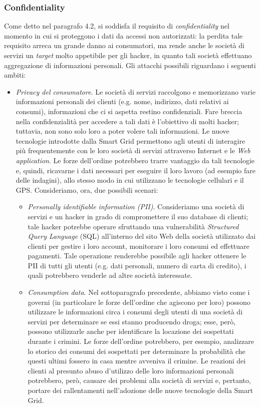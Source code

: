 \subsubsection{Confidentiality}
Come detto nel paragrafo 4.2, si soddisfa il requisito di \textit{confidentiality} nel momento in cui si proteggono i dati da accessi non autorizzati: la perdita tale requisito arreca un grande danno ai consumatori, ma rende anche le società di servizi un \textit{target} molto appetibile per gli hacker, in quanto tali società effettuano aggregazione di informazioni personali. Gli attacchi possibili riguardano i seguenti ambiti:
\begin{itemize}
\item \textit{Privacy del consumatore}. Le società di servizi raccolgono e memorizzano varie informazioni personali dei clienti (e.g. nome, indirizzo, dati relativi ai consumi), informazioni che ci si aspetta restino confidenziali. Fare breccia nella confidenzialità per accedere a tali dati è l'obiettivo di molti hacker; tuttavia, non sono solo loro a poter volere tali informazioni. Le nuove tecnologie introdotte dalla Smart Grid permettono agli utenti di interagire più frequentemente con le loro società di servizi attraverso Internet e le \textit{Web application}. Le forze dell'ordine potrebbero trarre vantaggio da tali tecnologie e, quindi, ricavarne i dati necessari per eseguire il loro lavoro (ad esempio fare delle indagini), allo stesso modo in cui utilizzano le tecnologie cellulari e il GPS. Consideriamo, ora, due possibili scenari:
	\begin{itemize}
	\item \textit{Personally identifiable information (PII)}. Consideriamo una società di servizi e un hacker in grado di compromettere il suo database di clienti; tale hacker potrebbe operare sfruttando una vulnerabilità \textit{Structured Query Language} (SQL) all'interno del sito Web della società utilizzato dai clienti per gestire i loro account, monitorare i loro consumi ed effettuare pagamenti. Tale operazione renderebbe possibile agli hacker ottenere le PII  di tutti gli utenti (e.g. dati personali, numero di carta di credito), i quali potrebbero venderle ad altre società interessate.
	\item \textit{Consumption data}. Nel sottoparagrafo precedente, abbiamo visto come i governi (in particolare le forze dell'ordine che agiscono per loro) possono utilizzare le informazioni circa i consumi degli utenti di una società di servizi per determinare se essi stanno producendo droga; esse, però, possono utilizzarle anche per identificare la locazione dei sospettati durante i crimini. Le forze dell'ordine potrebbero, per esempio, analizzare lo storico dei consumi dei sospettati per determinare la probabilità che questi ultimi fossero in casa mentre avveniva il crimine. Le reazioni dei clienti al presunto abuso d'utilizzo delle loro informazioni personali potrebbero, però, causare dei problemi alla società di servizi e, pertanto, portare dei rallentamenti nell'adozione delle nuove tecnologie della Smart Grid.

\end{itemize}
\end{itemize}

